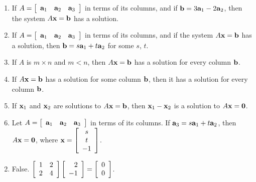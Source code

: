 \begin{multicols}{2}
\begin{ex}
\begin{enumerate}[label={\alph*.}]
\item If $A = \left[ \begin{array}{ccc}
\textbf{a}_{1} & \textbf{a}_{2} & \textbf{a}_{3}
\end{array} \right]$ in terms of its columns, and if $\textbf{b} = 3\textbf{a}_{1} - 2\textbf{a}_{2}$, then the system $A\textbf{x} = \textbf{b}$ has a solution.

\item If $A = \left[ \begin{array}{ccc}
\textbf{a}_{1} & \textbf{a}_{2} & \textbf{a}_{3}
\end{array} \right]$ in terms of its columns, and if the system $A\textbf{x} = \textbf{b}$ has a solution, then $\textbf{b} = s\textbf{a}_{1} + t\textbf{a}_{2}$ for some $s$, $t$.

\item If $A$ is $m \times n$ and $m < n$, then $A\textbf{x} = \textbf{b}$ has a solution for every column $\textbf{b}$.

\item If $A\textbf{x} = \textbf{b}$ has a solution for some column $\textbf{b}$, then it has a solution for every column $\textbf{b}$.

\item If $\textbf{x}_{1}$ and $\textbf{x}_{2}$ are solutions to $A\textbf{x} = \textbf{b}$, then $\textbf{x}_{1} - \textbf{x}_{2}$ is a solution to $A\textbf{x} = \textbf{0}$.

\item Let $A = \left[ \begin{array}{ccc}
\textbf{a}_{1} & \textbf{a}_{2} & \textbf{a}_{3} \end{array}\right]$ in terms of its columns. If $\textbf{a}_{3} = s\textbf{a}_{1} + t\textbf{a}_{2}$, then $A\textbf{x} = \textbf{0}$, where $\textbf{x} = \left[ \begin{array}{c}
s \\
t \\
-1
\end{array} \right]$.


\end{enumerate}
\begin{sol}
\begin{enumerate}[label={\alph*.}]
\setcounter{enumi}{1}
\item False. $\left[ \begin{array}{rr}
1 & 2 \\
2 & 4
\end{array} \right] \left[ \begin{array}{r}
2 \\
-1
\end{array} \right] = \left[ \begin{array}{r}
0 \\
0
\end{array} \right]$.


\end{enumerate}
\end{sol}
\end{ex}
\end{multicols}

